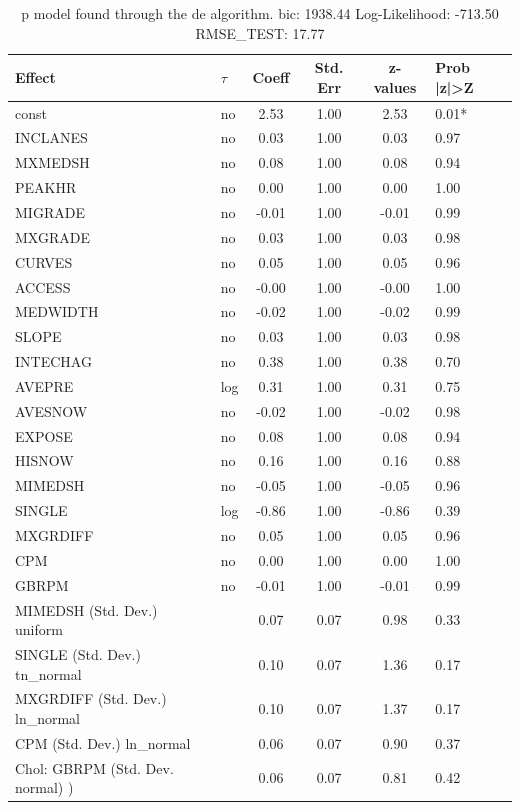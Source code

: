\begin{table}
	\caption{p model found through the de algorithm. bic: 1938.44 Log-Likelihood: -713.50 RMSE_TEST: 17.77}
	\begin{center}
		\begin{tabular}{|l|l|c|c|c|l|}
			\hline
			Effect & $\tau$ & Coeff & Std. Err & z-values & Prob |z|>Z \\
			\hline
			const & no & 2.53 & 1.00 & 2.53 & 0.01* \\
			\hline
			INCLANES & no & 0.03 & 1.00 & 0.03 & 0.97 \\
			\hline
			MXMEDSH & no & 0.08 & 1.00 & 0.08 & 0.94 \\
			\hline
			PEAKHR & no & 0.00 & 1.00 & 0.00 & 1.00 \\
			\hline
			MIGRADE & no & -0.01 & 1.00 & -0.01 & 0.99 \\
			\hline
			MXGRADE & no & 0.03 & 1.00 & 0.03 & 0.98 \\
			\hline
			CURVES & no & 0.05 & 1.00 & 0.05 & 0.96 \\
			\hline
			ACCESS & no & -0.00 & 1.00 & -0.00 & 1.00 \\
			\hline
			MEDWIDTH & no & -0.02 & 1.00 & -0.02 & 0.99 \\
			\hline
			SLOPE & no & 0.03 & 1.00 & 0.03 & 0.98 \\
			\hline
			INTECHAG & no & 0.38 & 1.00 & 0.38 & 0.70 \\
			\hline
			AVEPRE & log & 0.31 & 1.00 & 0.31 & 0.75 \\
			\hline
			AVESNOW & no & -0.02 & 1.00 & -0.02 & 0.98 \\
			\hline
			EXPOSE & no & 0.08 & 1.00 & 0.08 & 0.94 \\
			\hline
			HISNOW & no & 0.16 & 1.00 & 0.16 & 0.88 \\
			\hline
			MIMEDSH & no & -0.05 & 1.00 & -0.05 & 0.96 \\
			\hline
			SINGLE & log & -0.86 & 1.00 & -0.86 & 0.39 \\
			\hline
			MXGRDIFF & no & 0.05 & 1.00 & 0.05 & 0.96 \\
			\hline
			CPM & no & 0.00 & 1.00 & 0.00 & 1.00 \\
			\hline
			GBRPM & no & -0.01 & 1.00 & -0.01 & 0.99 \\
			\hline
			MIMEDSH (Std. Dev.) uniform &  & 0.07 & 0.07 & 0.98 & 0.33 \\
			\hline
			SINGLE (Std. Dev.) tn_normal &  & 0.10 & 0.07 & 1.36 & 0.17 \\
			\hline
			MXGRDIFF (Std. Dev.) ln_normal &  & 0.10 & 0.07 & 1.37 & 0.17 \\
			\hline
			CPM (Std. Dev.) ln_normal &  & 0.06 & 0.07 & 0.90 & 0.37 \\
			\hline
			 Chol: GBRPM (Std. Dev. normal) ) &  & 0.06 & 0.07 & 0.81 & 0.42 \\
			\hline
		\end{tabular}
	\end{center}
\end{table}
